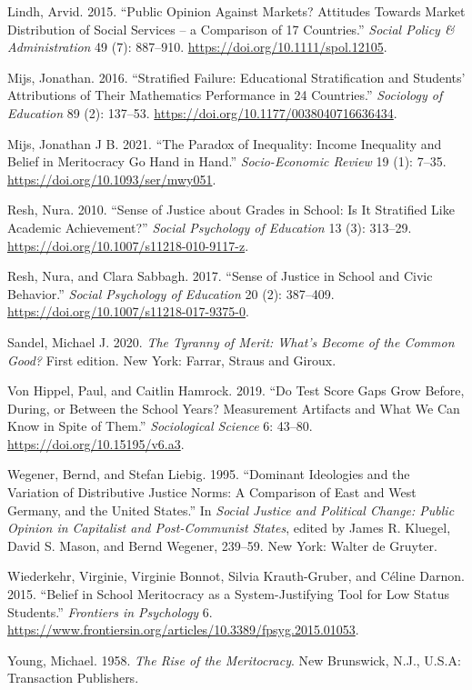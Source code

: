 \documentclass[
  letterpaper,
  DIV=11,
  numbers=noendperiod]{scrartcl}
\newlength{\cslhangindent}
\newenvironment{CSLReferences}[2] %
 {\begin{list}{}{%
  \setlength{\itemindent}{0pt}
  \setlength{\leftmargin}{0pt}
  \setlength{\parsep}{0pt}
  \ifodd #1
   \setlength{\leftmargin}{\cslhangindent}
   \setlength{\itemindent}{-1\cslhangindent}
  \fi
  \setlength{\itemsep}{#2\baselineskip}}}
 {\end{list}}
\begin{document}
\begin{CSLReferences}{1}{0}
Lindh, Arvid. 2015. {``Public Opinion Against Markets? Attitudes Towards
Market Distribution of Social Services -- a Comparison of 17
Countries.''} \emph{Social Policy \& Administration} 49 (7): 887--910.
\url{https://doi.org/10.1111/spol.12105}.

Mijs, Jonathan. 2016. {``Stratified Failure: Educational Stratification
and Students' Attributions of Their Mathematics Performance in 24
Countries.''} \emph{Sociology of Education} 89 (2): 137--53.
\url{https://doi.org/10.1177/0038040716636434}.

Mijs, Jonathan J B. 2021. {``The Paradox of Inequality: Income
Inequality and Belief in Meritocracy Go Hand in Hand.''}
\emph{Socio-Economic Review} 19 (1): 7--35.
\url{https://doi.org/10.1093/ser/mwy051}.

Resh, Nura. 2010. {``Sense of Justice about Grades in School: Is It
Stratified Like Academic Achievement?''} \emph{Social Psychology of
Education} 13 (3): 313--29.
\url{https://doi.org/10.1007/s11218-010-9117-z}.

Resh, Nura, and Clara Sabbagh. 2017. {``Sense of Justice in School and
Civic Behavior.''} \emph{Social Psychology of Education} 20 (2):
387--409. \url{https://doi.org/10.1007/s11218-017-9375-0}.

Sandel, Michael J. 2020. \emph{The Tyranny of Merit: What's Become of
the Common Good?} First edition. New York: {Farrar, Straus and Giroux}.

Von Hippel, Paul, and Caitlin Hamrock. 2019. {``Do Test Score Gaps Grow
Before, During, or Between the School Years? Measurement Artifacts and
What We Can Know in Spite of Them.''} \emph{Sociological Science} 6:
43--80. \url{https://doi.org/10.15195/v6.a3}.

Wegener, Bernd, and Stefan Liebig. 1995. {``Dominant Ideologies and the
Variation of Distributive Justice Norms: A Comparison of East and West
Germany, and the United States.''} In \emph{Social Justice and Political
Change: Public Opinion in Capitalist and Post-Communist States}, edited
by James R. Kluegel, David S. Mason, and Bernd Wegener, 239--59. New
York: Walter de Gruyter.

Wiederkehr, Virginie, Virginie Bonnot, Silvia Krauth-Gruber, and Céline
Darnon. 2015. {``Belief in School Meritocracy as a System-Justifying
Tool for Low Status Students.''} \emph{Frontiers in Psychology} 6.
\url{https://www.frontiersin.org/articles/10.3389/fpsyg.2015.01053}.

Young, Michael. 1958. \emph{The Rise of the Meritocracy}. New Brunswick,
N.J., U.S.A: Transaction Publishers.

\end{CSLReferences}
\end{document}
